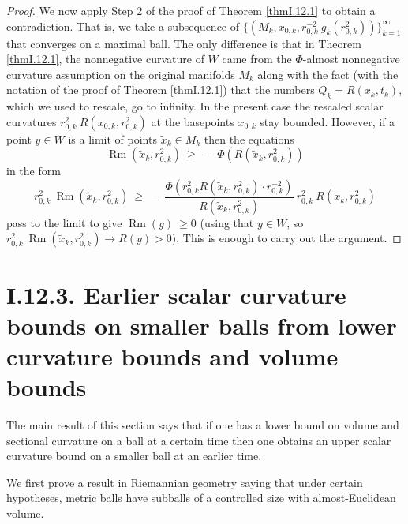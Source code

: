 \documentclass[12pt]{amsart}
\newcommand{\Rm}{\operatorname{Rm}}
\numberwithin{equation}{section}
\theoremstyle{plain}
\theoremstyle{definition}
\theoremstyle{remark}
\begin{document}
\begin{proof}
We now apply Step 2 of the proof of Theorem \ref{thmI.12.1} to obtain a contradiction.
That is, we take a subsequence of
$\{(M_k, x_{0,k}, r_{0,k}^{-2} \: g_k(r_{0,k}^2))\}_{k=1}^\infty$ that converges on a maximal ball.
The only difference is that in Theorem \ref{thmI.12.1}, the nonnegative curvature
of $W$ came from the $\Phi$-almost nonnegative curvature assumption on the
original manifolds $M_k$ along with the fact (with the notation of the proof of
Theorem \ref{thmI.12.1}) 
that the numbers $Q_k = R(x_k, t_k)$, which
we used to rescale, go to infinity.
In the present case 
the rescaled scalar curvatures $r_{0,k}^2 \: R(x_{0,k}, r_{0,k}^2)$ at the 
basepoints $x_{0,k}$
stay bounded.  
However, if a point $y \in W$ is a limit of points
$\widetilde{x}_k \in M_k$ then the equations
\begin{equation}
\Rm(\widetilde{x}_k, r_{0,k}^2) \: \ge \: - \: \Phi(R(\widetilde{x}_k, r_{0,k}^2))\end{equation} in the form
\begin{equation}
r_{0,k}^2 \: \Rm(\widetilde{x}_k, r_{0,k}^2) \: \ge \: - \: 
\frac{\Phi \left(  r_{0,k}^{2}
R(\widetilde{x}_k, r_{0,k}^2) \cdot r_{0,k}^{-2}
\right)}{ R(\widetilde{x}_k, r_{0,k}^2)} \: 
r_{0,k}^2 \: R(\widetilde{x}_k, r_{0,k}^2)
\end{equation}
pass to the limit to give $\Rm(y) \: \ge 0$
(using that $y \in W$, so $r_{0,k}^2 \: \Rm(\widetilde{x}_k, r_{0,k}^2) \rightarrow
R(y) > 0$).
This is enough to carry out the argument.
\end{proof}

\section{I.12.3. Earlier scalar curvature bounds on smaller balls from 
lower curvature bounds and volume bounds}
\label{I.12.3}

The main result of this section
says that if one has a lower bound on volume and sectional curvature
on a ball at a certain time then one obtains an upper scalar curvature bound on
a smaller ball at an earlier time.

We first prove a result in Riemannian geometry saying that under
certain hypotheses, metric balls have subballs of a controlled size
with almost-Euclidean volume.
\end{document}
